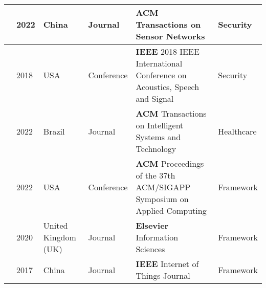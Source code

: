 \begin{footnotesize}
\begin{longtable}{p{1.2cm} p{1cm} p{1.6cm} p{3.2cm} p{5cm} p{3cm}}
        \cite{SunSecure} & 2022 & China & Journal & \textbf{ACM} Transactions on Sensor Networks & Security \\
        \hline
        \cite{xiong2018defending} & 2018 & USA & Conference & \textbf{IEEE} 2018 IEEE International Conference on Acoustics, Speech and Signal & Security \\
        \hline
        \cite{AntunesFederated} & 2022 & Brazil & Journal & \textbf{ACM} Transactions on Intelligent Systems and Technology & Healthcare \\
        \hline
        \cite{opara2022framework} & 2022 & USA & Conference & \textbf{ACM} Proceedings of the 37th ACM/SIGAPP Symposium on Applied Computing & Framework \\
        \hline
        \cite{perera2020designing} & 2020 & United Kingdom (UK) & Journal & \textbf{Elsevier} Information Sciences & Framework \\
        \hline
        \cite{zhang2017privacy} & 2017 & China & Journal & \textbf{IEEE} Internet of Things Journal & Framework \\
        \hline

\end{longtable}
\end{footnotesize}
